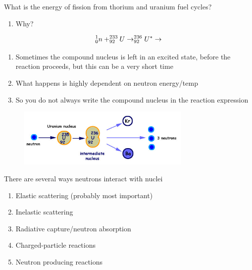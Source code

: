 \documentclass[aspectratio=1610,pdftex,dvipsnames,compress,xcolor={dvipsnames}]{beamer}
\begin{document}
\addtocounter{framenumber}{-1} 
\begin{frame}{What is the energy of fission from thorium and uranium fuel cycles?}
    \begin{enumerate}[series=outerlist,topsep=0pt,itemsep=21pt,leftmargin=*,label=(\arabic*)]
        \item[]Why?
    \end{enumerate}

    \vspace*{\fill}

    \begin{equation}
        \LARGE
        ^1_0n + ^{233}_{92}U \rightarrow ^{236}_{92}U^{*} \rightarrow   
    \end{equation}

    \vspace*{\fill}

    \begin{enumerate}[series=outerlist,topsep=0pt,itemsep=21pt,leftmargin=*,label=(\arabic*)]
        \item[]Sometimes the compound nucleus is left in an excited state, before the reaction proceeds, but this can be a very short time
        \item[]What happens is highly dependent on neutron energy/temp
        \item[]So you do not always write the compound nucleus in the reaction expression
    \end{enumerate}
\end{frame}


\begin{frame}{}
    \begin{figure}
        \centering
        \includegraphics[width=0.75\textwidth]{compound.jpg}
    \end{figure}
\end{frame}


\begin{frame}{There are several ways neutrons interact with nuclei}
    \begin{enumerate}[series=outerlist,topsep=0pt,itemsep=21pt,leftmargin=*,label=(\arabic*)]
        \item Elastic scattering (probably most important)
        \item Inelastic scattering
        \item Radiative capture/neutron absorption
        \item Charged-particle reactions
        \item Neutron producing reactions
    \end{enumerate}
\end{frame}
\end{document}
